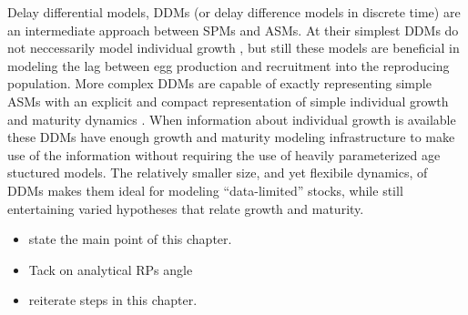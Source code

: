 %
Delay differential models, DDMs (or delay difference models in discrete time) 
are an intermediate approach between SPMs and ASMs. At their simplest DDMs do 
not neccessarily model individual growth \cite{dick_depletion-based_2011, aalto_separating_2015}, 
but still these models are beneficial in modeling the lag between egg production 
and recruitment into the reproducing population.  %
More complex DDMs are capable of exactly representing simple ASMs with an 
explicit and compact representation of simple individual growth and maturity 
dynamics \cite{deriso_harvesting_1980, schnute_general_1985, schnute_general_1987}.
When information about individual growth is available these DDMs have enough 
growth and maturity modeling infrastructure to make use of the information 
without requiring the use of heavily parameterized age stuctured models. %
The relatively smaller size, and yet flexibile dynamics, of DDMs makes them ideal for 
modeling ``data-limited'' stocks, while still entertaining varied hypotheses that 
relate growth and maturity.  

%
{\color{red}
\begin{itemize}
\item state the main point of this chapter.
\item Tack on analytical RPs angle
\item reiterate steps in this chapter.
\end{itemize}
}


